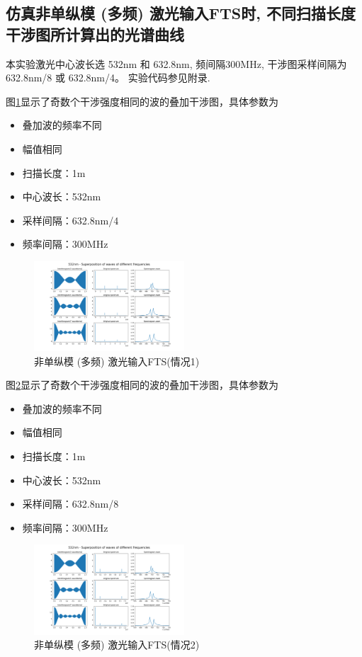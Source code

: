 \documentclass[conference]{IEEEtran}
\begin{document}
\subsection{仿真非单纵模 (多频) 激光输入FTS时, 不同扫描长度干涉图所计算出的光谱曲线}
本实验激光中心波长选 532nm 和 632.8nm, 频间隔300MHz, 干涉图采样间隔为632.8nm/8 或 632.8nm/4。
实验代码参见附录. 

图\ref{pic10}显示了奇数个干涉强度相同的波的叠加干涉图，具体参数为
\begin{itemize}
    \item 叠加波的频率不同
    \item 幅值相同
    \item 扫描长度：1m
    \item 中心波长：532nm
    \item 采样间隔：632.8nm/4
    \item 频率间隔：300MHz
\end{itemize}
\begin{figure}[htbp]
    \centerline{\includegraphics[width=0.5\textwidth]{pic10.png}}
    \caption{非单纵模 (多频) 激光输入FTS(情况1)}
    \label{pic10}
\end{figure}

图\ref{pic11}显示了奇数个干涉强度相同的波的叠加干涉图，具体参数为
\begin{itemize}
    \item 叠加波的频率不同
    \item 幅值相同
    \item 扫描长度：1m
    \item 中心波长：532nm
    \item 采样间隔：632.8nm/8
    \item 频率间隔：300MHz
\end{itemize}
\begin{figure}[htbp]
    \centerline{\includegraphics[width=0.5\textwidth]{pic11.png}}
    \caption{非单纵模 (多频) 激光输入FTS(情况2)}
    \label{pic11}
\end{figure}
\end{document}

